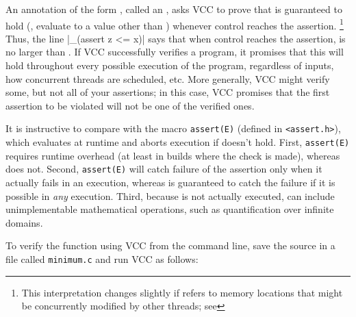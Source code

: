 An annotation of the form , called an , asks VCC to prove that
 is guaranteed to hold (\ie, evaluate to a value other than )
whenever control reaches the assertion.%
\footnote{
  This interpretation changes slightly if  refers to
  memory locations that might be concurrently modified by other
  threads; see }  
Thus, the line \vcc|_(assert z <= x)| says
that when control reaches the assertion,  is no larger than .
If VCC successfully verifies a program, it promises that this will hold throughout 
every possible execution of the program, regardless of inputs, how concurrent
threads are scheduled, etc. More generally, VCC might verify some, but not all of your assertions; 
in this case, VCC promises that the first assertion to be violated will not be one of the verified ones.

\begin{note}
It is instructive to compare  with the macro
\lstinline|assert(E)| (defined in \lstinline|<assert.h>|), which
evaluates   at runtime and aborts execution if 
doesn't hold. First, \lstinline|assert(E)| requires runtime overhead (at least
in builds where the check is made), whereas  does
not. Second, \lstinline|assert(E)| will catch failure of the 
assertion only when it actually fails in an execution, whereas 
 is guaranteed to catch the failure if it is
possible in \emph{any} execution. Third, because
 is not actually executed,  can include
unimplementable mathematical operations, such as
quantification over infinite domains.
\end{note}

To verify the function using VCC from the command line, save the source in a file called \lstinline|minimum.c|
and run VCC as follows:

